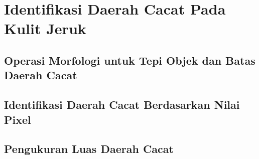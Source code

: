 \documentclass[laporan.tex]{subfiles}
\begin{document}
\section{Identifikasi Daerah Cacat Pada Kulit Jeruk}

\subsection{Operasi Morfologi untuk Tepi Objek dan Batas Daerah Cacat}

\subsection{Identifikasi Daerah Cacat Berdasarkan Nilai Pixel}

\subsection{Pengukuran Luas Daerah Cacat}
\end{document}
